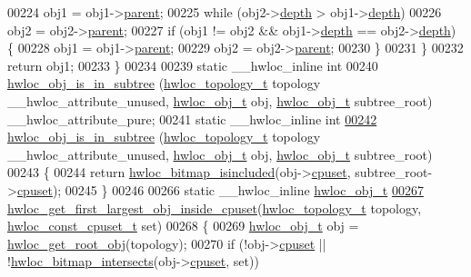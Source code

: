 \begin{DoxyCode}
00224       obj1 = obj1->\hyperlink{a00016_adc494f6aed939992be1c55cca5822900}{parent};
00225     \textcolor{keywordflow}{while} (obj2->\hyperlink{a00016_a9d82690370275d42d652eccdea5d3ee5}{depth} > obj1->\hyperlink{a00016_a9d82690370275d42d652eccdea5d3ee5}{depth})
00226       obj2 = obj2->\hyperlink{a00016_adc494f6aed939992be1c55cca5822900}{parent};
00227     \textcolor{keywordflow}{if} (obj1 != obj2 && obj1->\hyperlink{a00016_a9d82690370275d42d652eccdea5d3ee5}{depth} == obj2->\hyperlink{a00016_a9d82690370275d42d652eccdea5d3ee5}{depth}) \{
00228       obj1 = obj1->\hyperlink{a00016_adc494f6aed939992be1c55cca5822900}{parent};
00229       obj2 = obj2->\hyperlink{a00016_adc494f6aed939992be1c55cca5822900}{parent};
00230     \}
00231   \}
00232   \textcolor{keywordflow}{return} obj1;
00233 \}
00234 
00239 \textcolor{keyword}{static} \_\_hwloc\_inline \textcolor{keywordtype}{int}
00240 \hyperlink{a00053_ga08b5c1c1a95ed27a219c8af864690b3e}{hwloc_obj_is_in_subtree} (\hyperlink{a00039_ga9d1e76ee15a7dee158b786c30b6a6e38}{hwloc_topology_t} topology \_\_hwloc\_attribute\_unused, 
      \hyperlink{a00016}{hwloc_obj_t} obj, \hyperlink{a00016}{hwloc_obj_t} subtree\_root) \_\_hwloc\_attribute\_pure;
00241 \textcolor{keyword}{static} \_\_hwloc\_inline \textcolor{keywordtype}{int}
\hypertarget{a00031_source_l00242}{}\hyperlink{a00053_ga08b5c1c1a95ed27a219c8af864690b3e}{00242} \hyperlink{a00053_ga08b5c1c1a95ed27a219c8af864690b3e}{hwloc_obj_is_in_subtree} (\hyperlink{a00039_ga9d1e76ee15a7dee158b786c30b6a6e38}{hwloc_topology_t} topology \_\_hwloc\_attribute\_unused, 
      \hyperlink{a00016}{hwloc_obj_t} obj, \hyperlink{a00016}{hwloc_obj_t} subtree\_root)
00243 \{
00244   \textcolor{keywordflow}{return} \hyperlink{a00065_gaae29e14a926c198e8f91e6e4790621e7}{hwloc_bitmap_isincluded}(obj->\hyperlink{a00016_a67925e0f2c47f50408fbdb9bddd0790f}{cpuset}, subtree\_root->\hyperlink{a00016_a67925e0f2c47f50408fbdb9bddd0790f}{cpuset});
00245 \}
00246 
00266 \textcolor{keyword}{static} \_\_hwloc\_inline \hyperlink{a00016}{hwloc_obj_t}
\hypertarget{a00031_source_l00267}{}\hyperlink{a00054_gabcd5fa81a95fa5335950cae092277d5b}{00267} \hyperlink{a00054_gabcd5fa81a95fa5335950cae092277d5b}{hwloc_get_first_largest_obj_inside_cpuset}(\hyperlink{a00039_ga9d1e76ee15a7dee158b786c30b6a6e38}{hwloc_topology_t} topology, 
      \hyperlink{a00040_ga1f784433e9b606261f62d1134f6a3b25}{hwloc_const_cpuset_t} \textcolor{keyword}{set})
00268 \{
00269   \hyperlink{a00016}{hwloc_obj_t} obj = \hyperlink{a00053_gadbf58f6e187efbdb3cd9a8e30311b7d7}{hwloc_get_root_obj}(topology);
00270   \textcolor{keywordflow}{if} (!obj->\hyperlink{a00016_a67925e0f2c47f50408fbdb9bddd0790f}{cpuset} || !\hyperlink{a00065_ga575c27953709a8cb9a047aae65157526}{hwloc_bitmap_intersects}(obj->\hyperlink{a00016_a67925e0f2c47f50408fbdb9bddd0790f}{cpuset}, \textcolor{keyword}{set}))

\end{DoxyCode}

